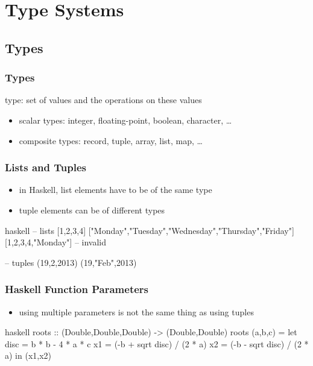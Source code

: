 \documentclass[dvipsnames]{beamer}
\theoremstyle{plain}
\begin{document}
\section{Type Systems}

\subsection{Types}

\begin{frame}
  \frametitle{Types}

  \begin{definition}
    \alert{type}: set of values and the operations on these values
  \end{definition}

  \pause
  \medskip
  \begin{itemize}
    \item scalar types: integer, floating-point, boolean, character, \ldots
    \item composite types: record, tuple, array, list, map, \ldots
  \end{itemize}
\end{frame}

\begin{frame}[fragile]
  \frametitle{Lists and Tuples}

  \begin{itemize}
    \item in Haskell, list elements have to be of the same type
    \item tuple elements can be of different types
  \end{itemize}

  \pause
  \begin{example}[Haskell]
    \begin{pygments}{haskell}
-- lists
[1,2,3,4]
["Monday","Tuesday","Wednesday","Thursday","Friday"]
[1,2,3,4,"Monday"]  -- invalid

-- tuples
(19,2,2013)
(19,"Feb",2013)
    \end{pygments}
  \end{example}
\end{frame}

\begin{frame}[fragile]
  \frametitle{Haskell Function Parameters}

  \begin{itemize}
    \item using multiple parameters is not the same thing as using tuples
  \end{itemize}

  \begin{example}[Haskell]
    \begin{pygments}{haskell}
roots :: (Double,Double,Double) -> (Double,Double)
roots (a,b,c) =
    let
        disc = b * b - 4 * a * c
        x1 = (-b + sqrt disc) / (2 * a)
        x2 = (-b - sqrt disc) / (2 * a)
    in
        (x1,x2)
    \end{pygments}
  \end{example}
\end{frame}
\end{document}
